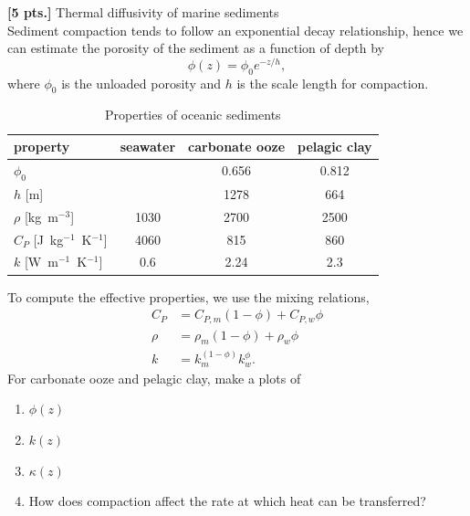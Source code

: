 \item \label{itm:diff} {\bf [5 pts.]} Thermal diffusivity of marine sediments \\
Sediment compaction tends to follow an exponential decay relationship, hence we
can estimate the porosity of the sediment as a function of depth by
\begin{equation}
    \phi(z) = \phi_0 e^{-z/h},
\end{equation}
where $\phi_0$ is the unloaded porosity and $h$ is the scale length for
compaction.
\begin{table}[hbt]
    \caption{Properties of oceanic sediments}
    \label{tab:oseds}
    \centering
    \begin{tabular}{@{}lccc@{}}
        \toprule
        \textbf{property} &
        \textbf{seawater} &
        \textbf{carbonate ooze} &
        \textbf{pelagic clay} \\
        \midrule
        $\phi_0$ & {} & 0.656 & 0.812 \\
        $h$ [m] & {} & 1278 & 664 \\
        $\rho$ [kg~m$^{-3}$] & 1030 & 2700 & 2500 \\
        $C_P$ [J~kg$^{-1}$~K$^{-1}$] & 4060 & 815 & 860 \\
        $k$ [W~m$^{-1}$~K$^{-1}$] & 0.6 & 2.24 & 2.3 \\
        \bottomrule
    \end{tabular}
\end{table}
To compute the effective properties, we use the mixing relations,
\begin{align}
    C_P &= C_{P,m} (1 - \phi) + C_{P,w} \phi \\
    \rho &= \rho_m (1 - \phi) + \rho_w \phi \\
    k &= k_m^{(1 - \phi)} k_w^\phi .
\end{align}
For carbonate ooze and pelagic clay, make a plots of
\begin{enumerate}
    \item $\phi(z)$
    \item $k(z)$
    \item $\kappa(z)$
    \item How does compaction affect the rate at which heat can be transferred?
\end{enumerate}
